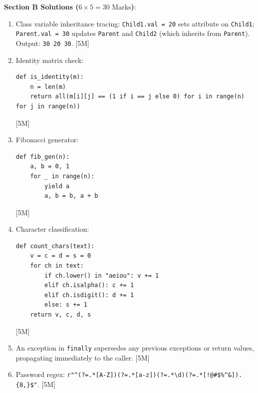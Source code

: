 \begin{solutionbox}
\medskip
\noindent\textbf{Section B Solutions ($6 \times 5 = 30\text{ Marks}$)}:
\begin{enumerate}[start=11]
    \item Class variable inheritance tracing: \texttt{Child1.val = 20} sets attribute on \texttt{Child1}; \texttt{Parent.val = 30} updates \texttt{Parent} and \texttt{Child2} (which inherits from \texttt{Parent}). Output: \texttt{30 20 30}. [5M]
    \item Identity matrix check:
    \begin{lstlisting}[language=Python3]
def is_identity(m):
    n = len(m)
    return all(m[i][j] == (1 if i == j else 0) for i in range(n) for j in range(n))
    \end{lstlisting} [5M]
    \item Fibonacci generator:
    \begin{lstlisting}[language=Python3]
def fib_gen(n):
    a, b = 0, 1
    for _ in range(n):
        yield a
        a, b = b, a + b
    \end{lstlisting} [5M]
    \item Character classification:
    \begin{lstlisting}[language=Python3]
def count_chars(text):
    v = c = d = s = 0
    for ch in text:
        if ch.lower() in "aeiou": v += 1
        elif ch.isalpha(): c += 1
        elif ch.isdigit(): d += 1
        else: s += 1
    return v, c, d, s
    \end{lstlisting} [5M]
    \item An exception in \texttt{finally} supersedes any previous exceptions or return values, propagating immediately to the caller. [5M]
    \item Password regex: \texttt{r"\textasciicircum(?=.*[A-Z])(?=.*[a-z])(?=.*\textbackslash d)(?=.*[!@\#\$\%\textasciicircum\&\*]).\{8,\}\$"}. [5M]
\end{enumerate}


\end{solutionbox}
